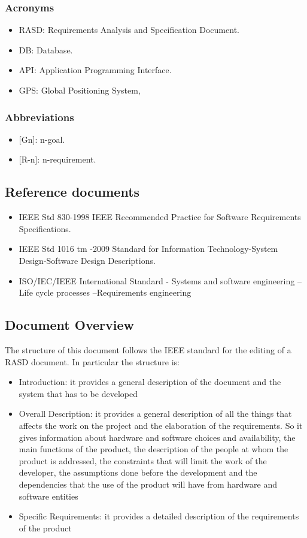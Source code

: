 \subsubsection{Acronyms}
\begin{itemize} 
	\item RASD: Requirements Analysis and Specification Document.
	\item DB: Database.
	\item API: Application Programming Interface.
	\item GPS: Global Positioning System,
\end{itemize}

\subsubsection{Abbreviations}
\begin{itemize}
	\item {[}Gn{]}: n-goal.
	\item {[}R-n{]}: n-requirement.
\end{itemize}


\subsection{Reference documents}
\begin{itemize}
	\item IEEE Std 830-1998 IEEE Recommended Practice for Software Requirements Specifications.
	\item IEEE Std 1016 tm -2009 Standard for Information Technology-System Design-Software Design Descriptions.
	\item ISO/IEC/IEEE International Standard - Systems and software engineering -- Life cycle processes --Requirements engineering
\end{itemize}

\subsection{Document Overview}
The structure of this document follows the IEEE standard for the editing of a RASD document. In particular the structure is:

\begin{itemize}
	\item Introduction: it provides a general description of the document and the system that has to be developed
	\item Overall Description: it provides a general description of all the things that  affects the work on the project and the elaboration of the requirements. So it gives information about hardware and software choices and availability, the main functions of the product, the description of the people at whom the product is addressed, the constraints that will limit the work of the developer, the assumptions done before the development and the dependencies that the use of the product will have from hardware and software entities
	\item Specific Requirements: it provides a detailed description of the requirements of the product
\end{itemize}



